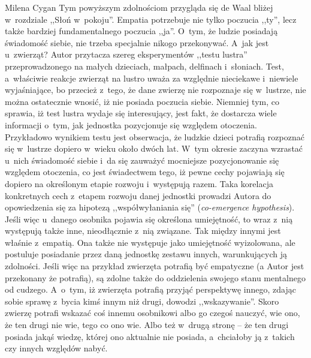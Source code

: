 \begin{recplenv}{Milena Cygan}
Tym powyższym zdolnościom przygląda się de Waal bliżej w~rozdziale ,,Słoń w~pokoju''. Empatia potrzebuje nie tylko
poczucia ,,ty'', lecz także bardziej fundamentalnego poczucia ,,ja''. O~tym, że ludzie posiadają świadomość siebie, nie
trzeba specjalnie nikogo przekonywać. A~jak jest u~zwierząt? Autor przytacza szereg eksperymentów ,,testu lustra''
przeprowadzonego na małych dzieciach, małpach, delfinach i~słoniach. Test, a~właściwie reakcje zwierząt na lustro uważa
za względnie nieciekawe i~niewiele wyjaśniające, bo przecież z~tego, że dane zwierzę nie rozpoznaje się w~lustrze, nie
można ostatecznie wnosić, iż nie posiada poczucia siebie. Niemniej tym, co sprawia, iż test lustra wydaje się
interesujący, jest fakt, że dostarcza wiele informacji o~tym, jak jednostka pozycjonuje się względem otoczenia.
Przykładowo wynikiem testu jest obserwacja, że ludzkie dzieci potrafią rozpoznać się w~lustrze dopiero w~wieku około
dwóch lat. W~tym okresie zaczyna wzrastać u~nich świadomość siebie i~da się zauważyć mocniejsze pozycjonowanie się
względem otoczenia, co jest świadectwem tego, iż pewne cechy pojawiają się dopiero na określonym etapie
rozwoju i~występują razem. Taka korelacja konkretnych cech z~etapem rozwoju danej jednostki prowadzi Autora do opowiedzenia się
za hipotezą ,,współwyłaniania się'' (\textit{co-emergence hypothesis}). Jeśli więc u~danego osobnika pojawia się
określona umiejętność, to wraz z~nią występują także inne, nieodłącznie z~nią związane. Tak między innymi jest właśnie
z~empatią. Ona także nie występuje jako umiejętność wyizolowana, ale postuluje posiadanie przez daną jednostkę zestawu
innych, warunkujących ją zdolności. Jeśli więc na przykład zwierzęta potrafią być empatyczne (a Autor jest przekonany
że potrafią), są zdolne także do oddzielenia swojego stanu mentalnego od cudzego. A~o~tym, iż zwierzęta potrafią przyjąć
perspektywę innego, zdając sobie sprawę z~bycia kimś innym niż drugi, dowodzi ,,wskazywanie''. Skoro zwierzę potrafi
wskazać coś innemu osobnikowi albo go czegoś nauczyć, wie ono, że ten drugi nie wie, tego co ono wie. Albo też w~drugą
stronę -- że ten drugi posiada jakąś wiedzę, której ono aktualnie nie posiada, a~chciałoby ją z~takich czy innych
względów nabyć.

\enlargethispage{-.5\baselineskip}


\end{recplenv}
